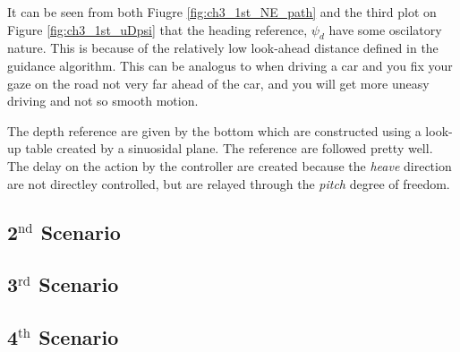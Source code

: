 		It can be seen from both Fiugre \ref{fig:ch3_1st_NE_path} and the
		third plot on Figure \ref{fig:ch3_1st_uDpsi} that the heading reference, $\psi_d$ have some
		oscilatory nature. This is because of the relatively low look-ahead distance defined in the
		guidance algorithm. This can be analogus to when driving a car and you fix your gaze on
		the road not very far ahead of the car, and you will get more uneasy driving and not so smooth motion. 

		The depth reference are given by the bottom which are constructed using a look-up table
		created by a sinuosidal plane. The reference are followed pretty well. The delay on the
		action by the controller are created because the \textit{heave} direction are not directley
		controlled, but are relayed through the \textit{pitch} degree of freedom.

	
	\subsection{2$^{\mathrm{nd}}$ Scenario}
	
	
	
	\subsection{3$^{\mathrm{rd}}$ Scenario}
	
	
	
	\subsection{4$^{\mathrm{th}}$ Scenario}

